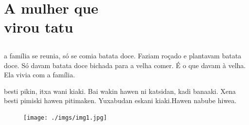 \openany\raggedright

\blankpage
\part[A mulher que virou tatu]{A mulher que\\ virou tatu}

\chapter*{}

\mbox{}\vspace*{\fill}


\setlength{\linewidth}{.6\linewidth}

 a família se reunia, só se comia
batata doce. Faziam roçado e plantavam
batata doce. Só davam batata doce bichada
para a velha comer. É o que davam à velha.
Ela vivia com a família.

\vspace{2em}


 besti pikin, itxa wani kiaki.
Bai wakin hawen ni katsidan, kadi banaaki.
Xena besti pimiski hawen pitimaken.
Yuxabudan eskani kiaki.Hawen
nabube hiwea.

\vspace*{\fill}

\pagebreak
\thispagestyle{empty}
\begin{figure}
\vspace*{-1.6cm}
\hspace*{-2.2cm}\texttt{[image: ./imgs/img1.jpg]}
\end{figure}

